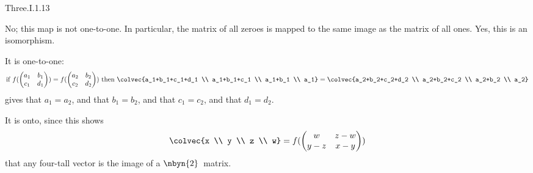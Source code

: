 \begin{ans}{Three.I.1.13}
    \begin{exparts}
      \partsitem No; this map is not one-to-one.
        In particular, the matrix of all zeroes is mapped to the same
        image as the matrix of all ones.
      \partsitem Yes, this is an isomorphism.

        It is one-to-one:
        \begin{equation*}
          \text{if }
          f(\begin{pmatrix}
              a_1  &b_1  \\
              c_1  &d_1
            \end{pmatrix})
         =f(\begin{pmatrix}
              a_2  &b_2  \\
              c_2  &d_2
            \end{pmatrix})
          \text{ then }
          \colvec{a_1+b_1+c_1+d_1 \\ a_1+b_1+c_1 \\ a_1+b_1 \\ a_1}
          =\colvec{a_2+b_2+c_2+d_2 \\ a_2+b_2+c_2 \\ a_2+b_2 \\ a_2}
        \end{equation*}
        gives that \( a_1=a_2 \), and that \( b_1=b_2 \),
        and that \( c_1=c_2 \), and that \( d_1=d_2 \).

        It is onto, since this shows
        \begin{equation*}
          \colvec{x \\ y \\ z \\ w}
         =f(\begin{pmatrix}
              w    &z-w  \\
              y-z  &x-y
            \end{pmatrix})
        \end{equation*}
        that any four-tall vector is the image of a $\nbyn{2}$~matrix.


\end{exparts}
\end{ans}
